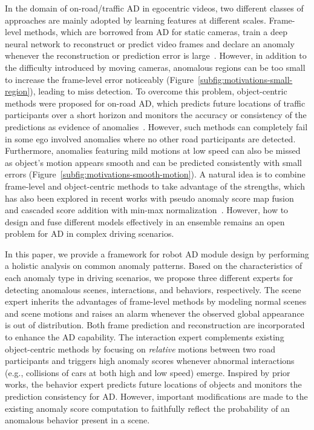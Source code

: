 In the domain of on-road/traffic AD in egocentric videos, two different classes of approaches are mainly adopted by learning features at different scales. Frame-level methods, which are borrowed from AD for static cameras, train a deep neural network to reconstruct or predict video frames and declare an anomaly whenever the reconstruction or prediction error is large~\citep{liu2018future,hasan2016learning}. However, in addition to the difficulty introduced by moving cameras, anomalous regions can be too small to increase the frame-level error noticeably (Figure~\ref{subfig:motivations-small-region}), leading to miss detection. To overcome this problem, object-centric methods were proposed for on-road AD, which predicts future locations of traffic participants over a short horizon and monitors the accuracy or consistency of the predictions as evidence of anomalies~\citep{yao2019unsupervised}. However, such methods can completely fail in some ego involved anomalies where no other road participants are detected. Furthermore, anomalies featuring mild motions at low speed can also be missed as object's motion appears smooth and can be predicted consistently with small errors (Figure~\ref{subfig:motivations-smooth-motion}). A natural idea is to combine frame-level and object-centric methods to take advantage of the strengths, which has also been explored in recent works with pseudo anomaly score map fusion~\citep{yao2022dota} and cascaded score addition with min-max normalization~\citep{fang2022traffic}. However, how to design and fuse different models effectively in an ensemble remains an open problem for AD in complex driving scenarios.

In this paper, we provide a framework for robot AD module design by performing a holistic analysis on common anomaly patterns. Based on the characteristics of each anomaly type in driving scenarios, we propose three different experts for detecting anomalous scenes, interactions, and behaviors, respectively. The scene expert inherits the advantages of frame-level methods by modeling normal scenes and scene motions and raises an alarm whenever the observed global appearance is out of distribution. Both frame prediction and reconstruction are incorporated to enhance the AD capability. The interaction expert complements existing object-centric methods by focusing on \textit{relative} motions between two road participants and triggers high anomaly scores whenever abnormal interactions (e.g., collisions of cars at both high and low speed) emerge. Inspired by prior works, the behavior expert predicts future locations of objects and monitors the prediction consistency for AD. However, important modifications are made to the existing anomaly score computation to faithfully reflect the probability of an anomalous behavior present in a scene.


